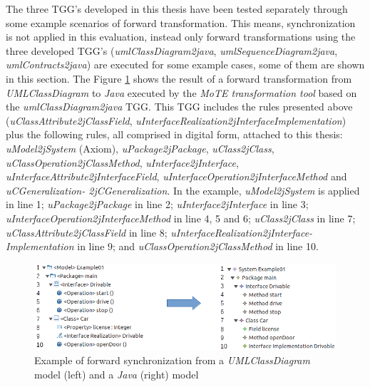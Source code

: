 \documentclass[tuberlin,cic,tc,english,noabntcite]{iiufrgs}
\begin{document}
The three TGG's developed in this thesis have been tested separately through some example scenarios of forward transformation. This means, synchronization is not applied in this evaluation, instead only forward transformations using the three developed TGG's (\emph{umlClassDiagram2java}, \emph{umlSequenceDiagram2java}, \emph{umlContracts2java}) are executed for some example cases, some of them are shown in this section. The Figure \ref{fig:umlClassDiagram2java_Example01} shows the result of a forward transformation from \emph{UMLClassDiagram} to \emph{Java} executed by the \emph{MoTE transformation tool} based on the \emph{umlClassDiagram2java} TGG. This TGG includes the rules presented above (\emph{uClassAttribute2jClassField}, \emph{uInterfaceRealization2jInterfaceImplementation}) plus the following rules, all comprised in digital form, attached to this thesis: \emph{uModel2jSystem} (Axiom), \emph{uPackage2jPackage}, \emph{uClass2jClass}, \emph{uClassOperation2jClassMethod}, \emph{uInterface2jInterface}, \emph{uInterfaceAttribute2jInterfaceField}, \emph{uInterfaceOperation2jInterfaceMethod} and \emph{uCGeneralization- 2jCGeneralization}. In the example, \emph{uModel2jSystem} is applied in line 1; \emph{uPackage2jPackage} in line 2; \emph{uInterface2jInterface} in line 3; \emph{uInterfaceOperation2jInterfaceMethod} in line 4, 5 and 6; \emph{uClass2jClass} in line 7; \emph{uClassAttribute2jClassField} in line 8;  \emph{uInterfaceRealization2jInterface- Implementation} in line 9; and \emph{uClassOperation2jClassMethod} in line 10.

\begin{figure}[H]
    \caption{Example of forward synchronization from a \emph{UMLClassDiagram} model (left) and a \emph{Java} (right) model}
    \begin{center}
       	\includegraphics[width=.9\textwidth]{umlClassDiagram2java_Example01}
    \end{center}
    \label{fig:umlClassDiagram2java_Example01}
\end{figure}
\end{document}
